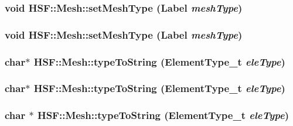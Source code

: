 \label{classHSF_1_1Mesh_a00a74cf612e08f90f88ada5c33a2a802}
\hypertarget{classHSF_1_1Mesh_a00a74cf612e08f90f88ada5c33a2a802}{
\subsubsection[{setMeshType}]{\setlength{\rightskip}{0pt plus 5cm}void HSF::Mesh::setMeshType ({\bf Label} {\em meshType})}}
\label{classHSF_1_1Mesh_a00a74cf612e08f90f88ada5c33a2a802}
\hypertarget{classHSF_1_1Mesh_a00a74cf612e08f90f88ada5c33a2a802}{
\subsubsection[{setMeshType}]{\setlength{\rightskip}{0pt plus 5cm}void HSF::Mesh::setMeshType ({\bf Label} {\em meshType})}}
\label{classHSF_1_1Mesh_a00a74cf612e08f90f88ada5c33a2a802}
\hypertarget{classHSF_1_1Mesh_a5e48ab70f682c324a222208fceb66388}{
\subsubsection[{typeToString}]{\setlength{\rightskip}{0pt plus 5cm}char$\ast$ HSF::Mesh::typeToString (ElementType\_\-t {\em eleType})}}
\label{classHSF_1_1Mesh_a5e48ab70f682c324a222208fceb66388}
\hypertarget{classHSF_1_1Mesh_a5e48ab70f682c324a222208fceb66388}{
\subsubsection[{typeToString}]{\setlength{\rightskip}{0pt plus 5cm}char$\ast$ HSF::Mesh::typeToString (ElementType\_\-t {\em eleType})}}
\label{classHSF_1_1Mesh_a5e48ab70f682c324a222208fceb66388}
\hypertarget{classHSF_1_1Mesh_a39999f4b36df55778f07f6696985052f}{
\subsubsection[{typeToString}]{\setlength{\rightskip}{0pt plus 5cm}char $\ast$ HSF::Mesh::typeToString (ElementType\_\-t {\em eleType})}}
